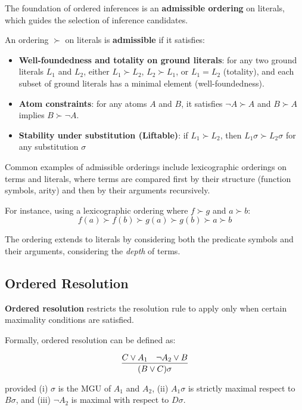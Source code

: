 The foundation of ordered inferences is an \textbf{admissible ordering} on literals, which guides the selection of inference candidates.

An ordering \(\succ\) on literals is \textbf{admissible} if it satisfies:
\begin{itemize}
    \item \textbf{Well-foundedness and totality on ground literals}: for any two ground literals \(L_1\) and \(L_2\), either \(L_1 \succ L_2\), \(L_2 \succ L_1\), or \(L_1 = L_2\) (totality), and each subset of ground literals has a minimal element (well-foundedness).
    \item \textbf{Atom constraints}: for any atoms \(A\) and \(B\), it satisfies \(\neg A \succ A\) and \(B \succ A\) implies \(B \succ \neg A\).
    \item \textbf{Stability under substitution (Liftable)}: if \(L_1 \succ L_2\), then \(L_1\sigma \succ L_2\sigma\) for any substitution \(\sigma\)
\end{itemize}

Common examples of admissible orderings include lexicographic orderings on terms and literals, where terms are compared first by their structure (function symbols, arity) and then by their arguments recursively.

For instance, using a lexicographic ordering where \(f \succ g\) and \(a \succ b\):
\[f(a) \succ f(b) \succ g(a) \succ g(b) \succ a \succ b\]

The ordering extends to literals by considering both the predicate symbols and their arguments, considering the \emph{depth} of terms.

\subsection{Ordered Resolution}

\textbf{Ordered resolution} restricts the resolution rule to apply only when certain maximality conditions are satisfied.

Formally, ordered resolution can be defined as:

\begin{equation}
  \infer{(B\lor C)\sigma}{C\lor A_1 & \neg A_2 \lor B}
\end{equation}
  
\indent provided (i) \(\sigma\) is the MGU of \(A_1\) and \(A_2\), (ii) \(A_1\sigma\) is strictly maximal respect to \(B\sigma\), and \indent (iii) \(\neg A_2\) is maximal with respect to \(D\sigma\).



